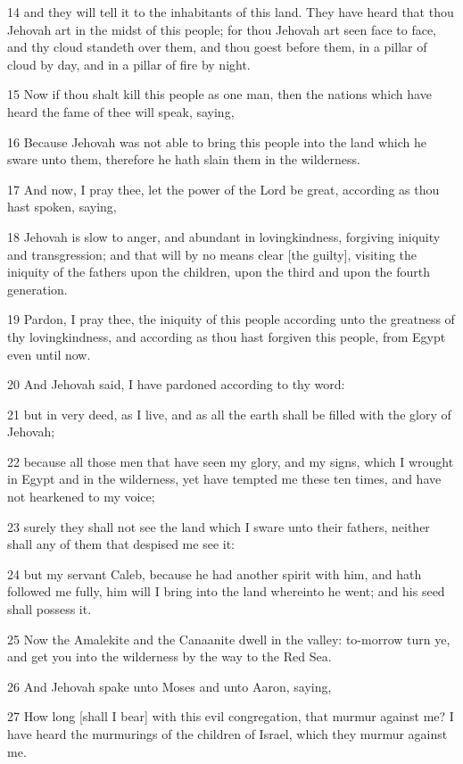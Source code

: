 \par 14 and they will tell it to the inhabitants of this land. They have heard that thou Jehovah art in the midst of this people; for thou Jehovah art seen face to face, and thy cloud standeth over them, and thou goest before them, in a pillar of cloud by day, and in a pillar of fire by night.
\par 15 Now if thou shalt kill this people as one man, then the nations which have heard the fame of thee will speak, saying,
\par 16 Because Jehovah was not able to bring this people into the land which he sware unto them, therefore he hath slain them in the wilderness.
\par 17 And now, I pray thee, let the power of the Lord be great, according as thou hast spoken, saying,
\par 18 Jehovah is slow to anger, and abundant in lovingkindness, forgiving iniquity and transgression; and that will by no means clear [the guilty], visiting the iniquity of the fathers upon the children, upon the third and upon the fourth generation.
\par 19 Pardon, I pray thee, the iniquity of this people according unto the greatness of thy lovingkindness, and according as thou hast forgiven this people, from Egypt even until now.
\par 20 And Jehovah said, I have pardoned according to thy word:
\par 21 but in very deed, as I live, and as all the earth shall be filled with the glory of Jehovah;
\par 22 because all those men that have seen my glory, and my signs, which I wrought in Egypt and in the wilderness, yet have tempted me these ten times, and have not hearkened to my voice;
\par 23 surely they shall not see the land which I sware unto their fathers, neither shall any of them that despised me see it:
\par 24 but my servant Caleb, because he had another spirit with him, and hath followed me fully, him will I bring into the land whereinto he went; and his seed shall possess it.
\par 25 Now the Amalekite and the Canaanite dwell in the valley: to-morrow turn ye, and get you into the wilderness by the way to the Red Sea.
\par 26 And Jehovah spake unto Moses and unto Aaron, saying,
\par 27 How long [shall I bear] with this evil congregation, that murmur against me? I have heard the murmurings of the children of Israel, which they murmur against me.
